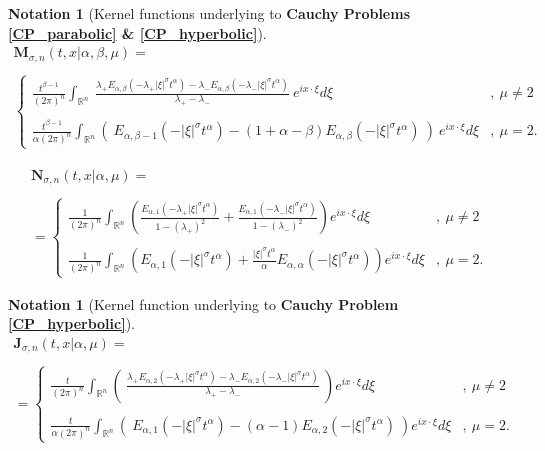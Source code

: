 \documentclass{amsart}
\theoremstyle{definition}
\newtheorem{notation}[theorem]{Notation}
\theoremstyle{remark}
\numberwithin{equation}{section}
\newcommand{\BR}{{\mathbb R}}
\begin{document}
\begin{notation}[Kernel functions underlying to {\bf Cauchy Problems \ref{CP_parabolic} \& \ref{CP_hyperbolic}}]\label{MarquesNelsonKernels}
	\begin{eqnarray*}
		{\bm M}_{\sigma,n}(t,x|\alpha,\beta,\mu)=\\ \ \\
		\begin{cases}
			\displaystyle 	\frac{t^{\beta-1}}{(2\pi)^n} \int_{\BR^n}~\frac{\lambda_+E_{\alpha,\beta}(-\lambda_+|\xi|^\sigma t^\alpha)-\lambda_-E_{\alpha,\beta}(-\lambda_-|\xi|^\sigma t^\alpha)}{\lambda_+-\lambda_-}~e^{ix\cdot \xi}d\xi&,~\mu\neq 2 \\ \ \\
			\displaystyle \frac{t^{\beta-1}}{\alpha(2\pi)^n} \int_{\BR^n} \left(~E_{\alpha,\beta-1}(-|\xi|^\sigma t^{\alpha})-(1+\alpha-\beta)E_{\alpha,\beta}(-|\xi|^\sigma t^{\alpha})~\right)~e^{ix\cdot \xi}d\xi&,~\mu= 2.
		\end{cases} 
	\end{eqnarray*}
	
	\begin{eqnarray*}{\bm N}_{\sigma,n}(t,x|\alpha,\mu)=\\  \ \\
		=\begin{cases}
			\displaystyle \frac{1}{(2\pi)^n} \int_{\BR^n}	\left(\frac{E_{\alpha,1}(-\lambda_+|\xi|^\sigma t^\alpha)}{1-(\lambda_+)^2}+\frac{E_{\alpha,1}(-\lambda_-|\xi|^\sigma t^\alpha)}{1-(\lambda_-)^2}\right)e^{ix\cdot \xi}d\xi &,~\mu\neq 2 \\ \ \\
			\displaystyle \frac{1}{(2\pi)^n} \int_{\BR^n}\left(E_{\alpha,1}(-|\xi|^\sigma t^\alpha)+\frac{|\xi|^{\sigma}t^{\alpha}}{\alpha}E_{\alpha,\alpha}(-|\xi|^\sigma t^{\alpha})\right)e^{ix\cdot \xi}d\xi&,~\mu= 2.
		\end{cases} 
	\end{eqnarray*}
\end{notation}

\begin{notation}[Kernel function underlying to {\bf Cauchy Problem \ref{CP_hyperbolic}}]\label{JorgeKernel}
	\begin{eqnarray*}
		{\bm J}_{\sigma,n}(t,x|\alpha,\mu)=\\ \ \\
		=\begin{cases}
			\displaystyle 	\frac{t}{(2\pi)^n}\int_{\BR^n}\left(~\frac{\lambda_+E_{\alpha,2}(-\lambda_+|\xi|^\sigma t^\alpha)-\lambda_-E_{\alpha,2}(-\lambda_-|\xi|^\sigma t^\alpha)}{\lambda_+-\lambda_-}~\right) e^{i x\cdot \xi}d\xi&,~\mu\neq 2 \\ \ \\
			\displaystyle \frac{t}{\alpha(2\pi)^n}\int_{\BR^n}\left(~E_{\alpha,1}(-|\xi|^\sigma t^\alpha)-(\alpha-1)E_{\alpha,2}(-|\xi|^\sigma t^\alpha)~\right)e^{ix\cdot \xi}d\xi&,~\mu= 2.
		\end{cases} 
	\end{eqnarray*}
\end{notation}
\end{document}
